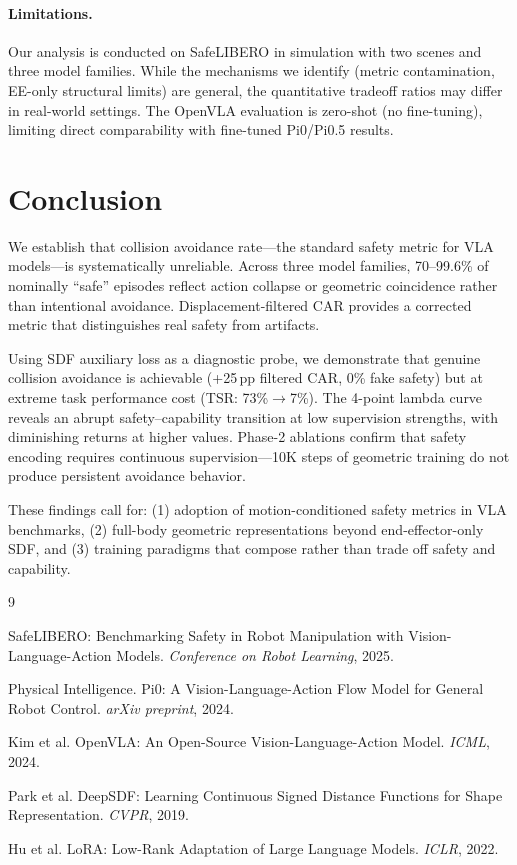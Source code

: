 \documentclass[10pt,twocolumn]{article}
\begin{document}
\paragraph{Limitations.}
Our analysis is conducted on SafeLIBERO in simulation with two scenes and three model families. While the mechanisms we identify (metric contamination, EE-only structural limits) are general, the quantitative tradeoff ratios may differ in real-world settings. The OpenVLA evaluation is zero-shot (no fine-tuning), limiting direct comparability with fine-tuned Pi0/Pi0.5 results.

\section{Conclusion}

We establish that collision avoidance rate---the standard safety metric for VLA models---is systematically unreliable. Across three model families, 70--99.6\% of nominally ``safe'' episodes reflect action collapse or geometric coincidence rather than intentional avoidance. Displacement-filtered CAR provides a corrected metric that distinguishes real safety from artifacts.

Using SDF auxiliary loss as a diagnostic probe, we demonstrate that genuine collision avoidance is achievable (+25\,pp filtered CAR, 0\% fake safety) but at extreme task performance cost (TSR: 73\%$\to$7\%). The 4-point lambda curve reveals an abrupt safety--capability transition at low supervision strengths, with diminishing returns at higher values. Phase-2 ablations confirm that safety encoding requires continuous supervision---10K steps of geometric training do not produce persistent avoidance behavior.

These findings call for: (1) adoption of motion-conditioned safety metrics in VLA benchmarks, (2) full-body geometric representations beyond end-effector-only SDF, and (3) training paradigms that compose rather than trade off safety and capability.

{\small

\begin{thebibliography}{9}

SafeLIBERO: Benchmarking Safety in Robot Manipulation with Vision-Language-Action Models.
\textit{Conference on Robot Learning}, 2025.

Physical Intelligence. Pi0: A Vision-Language-Action Flow Model for General Robot Control.
\textit{arXiv preprint}, 2024.

Kim et al. OpenVLA: An Open-Source Vision-Language-Action Model.
\textit{ICML}, 2024.

Park et al. DeepSDF: Learning Continuous Signed Distance Functions for Shape Representation.
\textit{CVPR}, 2019.

Hu et al. LoRA: Low-Rank Adaptation of Large Language Models.
\textit{ICLR}, 2022.

\end{thebibliography}
}
\end{document}
